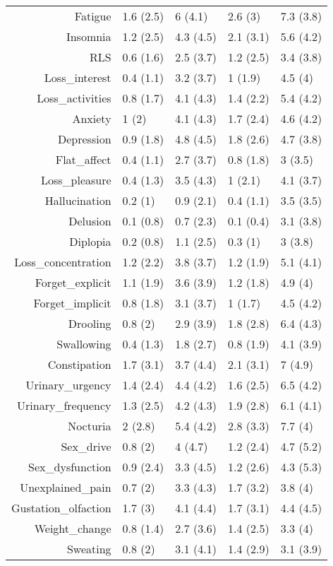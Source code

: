 \begin{table}[ht]
\begin{tabular}{rllll}
  Fatigue & 1.6 (2.5) & 6 (4.1) & 2.6 (3) & 7.3 (3.8) \\ 
  Insomnia & 1.2 (2.5) & 4.3 (4.5) & 2.1 (3.1) & 5.6 (4.2) \\ 
  RLS & 0.6 (1.6) & 2.5 (3.7) & 1.2 (2.5) & 3.4 (3.8) \\ 
  Loss\_interest & 0.4 (1.1) & 3.2 (3.7) & 1 (1.9) & 4.5 (4) \\ 
  Loss\_activities & 0.8 (1.7) & 4.1 (4.3) & 1.4 (2.2) & 5.4 (4.2) \\ 
  Anxiety & 1 (2) & 4.1 (4.3) & 1.7 (2.4) & 4.6 (4.2) \\ 
  Depression & 0.9 (1.8) & 4.8 (4.5) & 1.8 (2.6) & 4.7 (3.8) \\ 
  Flat\_affect & 0.4 (1.1) & 2.7 (3.7) & 0.8 (1.8) & 3 (3.5) \\ 
  Loss\_pleasure & 0.4 (1.3) & 3.5 (4.3) & 1 (2.1) & 4.1 (3.7) \\ 
  Hallucination & 0.2 (1) & 0.9 (2.1) & 0.4 (1.1) & 3.5 (3.5) \\ 
  Delusion & 0.1 (0.8) & 0.7 (2.3) & 0.1 (0.4) & 3.1 (3.8) \\ 
  Diplopia & 0.2 (0.8) & 1.1 (2.5) & 0.3 (1) & 3 (3.8) \\ 
  Loss\_concentration & 1.2 (2.2) & 3.8 (3.7) & 1.2 (1.9) & 5.1 (4.1) \\ 
  Forget\_explicit & 1.1 (1.9) & 3.6 (3.9) & 1.2 (1.8) & 4.9 (4) \\ 
  Forget\_implicit & 0.8 (1.8) & 3.1 (3.7) & 1 (1.7) & 4.5 (4.2) \\ 
  Drooling & 0.8 (2) & 2.9 (3.9) & 1.8 (2.8) & 6.4 (4.3) \\ 
  Swallowing & 0.4 (1.3) & 1.8 (2.7) & 0.8 (1.9) & 4.1 (3.9) \\ 
  Constipation & 1.7 (3.1) & 3.7 (4.4) & 2.1 (3.1) & 7 (4.9) \\ 
  Urinary\_urgency & 1.4 (2.4) & 4.4 (4.2) & 1.6 (2.5) & 6.5 (4.2) \\ 
  Urinary\_frequency & 1.3 (2.5) & 4.2 (4.3) & 1.9 (2.8) & 6.1 (4.1) \\ 
  Nocturia & 2 (2.8) & 5.4 (4.2) & 2.8 (3.3) & 7.7 (4) \\ 
  Sex\_drive & 0.8 (2) & 4 (4.7) & 1.2 (2.4) & 4.7 (5.2) \\ 
  Sex\_dysfunction & 0.9 (2.4) & 3.3 (4.5) & 1.2 (2.6) & 4.3 (5.3) \\ 
  Unexplained\_pain & 0.7 (2) & 3.3 (4.3) & 1.7 (3.2) & 3.8 (4) \\ 
  Gustation\_olfaction & 1.7 (3) & 4.1 (4.4) & 1.7 (3.1) & 4.4 (4.5) \\ 
  Weight\_change & 0.8 (1.4) & 2.7 (3.6) & 1.4 (2.5) & 3.3 (4) \\ 
  Sweating & 0.8 (2) & 3.1 (4.1) & 1.4 (2.9) & 3.1 (3.9) \\ 
   \bottomrule
\end{tabular}
\end{table}
